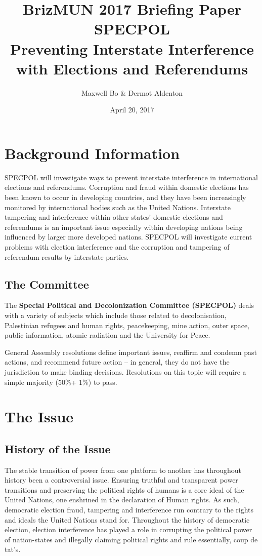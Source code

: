 \documentclass[11pt,a4paper]{report}
\begin{document}
\title{BrizMUN 2017 Briefing Paper \\ SPECPOL \\ Preventing Interstate Interference with Elections and Referendums}
\author{Maxwell Bo \& Dermot Aldenton}
\date{April 20, 2017}
\maketitle


\chapter{Background Information}

SPECPOL will investigate ways to prevent interstate interference in international elections and referendums. Corruption and fraud within domestic elections has been known to occur in developing countries, and they have been increasingly monitored by international bodies such as the United Nations. Interstate tampering and interference within other states’ domestic elections and referendums is an important issue especially within developing nations being influenced by larger more developed nations. SPECPOL will investigate current problems with election interference and the corruption and tampering of referendum results by interstate parties.

\section{The Committee}

The \textbf{Special Political and Decolonization Committee (SPECPOL)} deals with a variety of subjects which include those related to decolonisation, Palestinian refugees and human rights, peacekeeping, mine action, outer space, public information, atomic radiation and the University for Peace. 

General Assembly resolutions define important issues, reaffirm and condemn past actions, and recommend future action – in general, they do not have the jurisdiction to make binding decisions. Resolutions on this topic will require a simple majority (50\%+ 1\%) to pass.

\chapter{The Issue}
\section{History of the Issue}
The stable transition of power from one platform to another has throughout history been a controversial issue. Ensuring truthful and transparent power transitions and preserving the political rights of humans is a core ideal of the United Nations, one enshrined in the declaration of Human rights. As such, democratic election fraud, tampering and interference run contrary to the rights and ideals the United Nations stand for. Throughout the history of democratic election, election interference has played a role in corrupting the political power of nation-states and illegally claiming political rights and rule essentially, coup de tat's.
\end{document}
